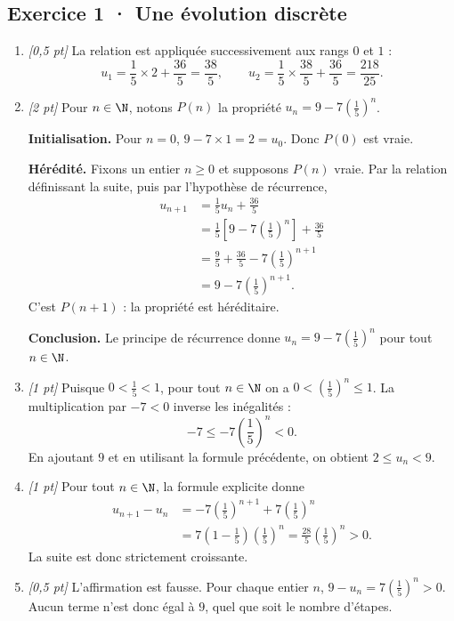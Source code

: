 \subsection*{Exercice 1 · Une évolution discrète}\begin{enumerate}

\item \textit{[0,5 pt]} La relation est appliquée successivement aux rangs $0$ et $1$ :\[u_1=\frac{1}{5}\times 2+\frac{36}{5}=\frac{38}{5},\qquad u_2=\frac{1}{5}\times \frac{38}{5}+\frac{36}{5}=\frac{218}{25}.\]

\item \textit{[2 pt]} Pour $n\in\N$, notons $P(n)$ la propriété $u_n=9-7\left(\frac{1}{5}\right)^n$.
\par\smallskip\textbf{Initialisation.} Pour $n=0$, $9-7\times1=2=u_0$. Donc $P(0)$ est vraie.
\par\smallskip\textbf{Hérédité.} Fixons un entier $n\ge0$ et supposons $P(n)$ vraie. Par la relation définissant la suite, puis par l'hypothèse de récurrence,
\[\begin{aligned}u_{n+1}&=\frac{1}{5}u_n+\frac{36}{5}\\
&=\frac{1}{5}\left[9-7\left(\frac{1}{5}\right)^n\right]+\frac{36}{5}\\
&=\frac{9}{5}+\frac{36}{5}-7\left(\frac{1}{5}\right)^{n+1}\\
&=9-7\left(\frac{1}{5}\right)^{n+1}.
\end{aligned}\]
C'est $P(n+1)$ : la propriété est héréditaire.
\par\smallskip\textbf{Conclusion.} Le principe de récurrence donne $u_n=9-7\left(\frac{1}{5}\right)^n$ pour tout $n\in\N$.

\item \textit{[1 pt]} Puisque $0<\frac{1}{5}<1$, pour tout $n\in\N$ on a $0<(\frac{1}{5})^n\le1$. La multiplication par $-7<0$ inverse les inégalités :
\[-7\le-7(\frac{1}{5})^n<0.\]
En ajoutant $9$ et en utilisant la formule précédente, on obtient $2\le u_n<9$.

\item \textit{[1 pt]} Pour tout $n\in\N$, la formule explicite donne
\[\begin{aligned}u_{n+1}-u_n&=-7(\frac{1}{5})^{n+1}+7(\frac{1}{5})^n\\&=7(1-\frac{1}{5})(\frac{1}{5})^n=\frac{28}{5}(\frac{1}{5})^n>0.\end{aligned}\]
La suite est donc strictement croissante.

\item \textit{[0,5 pt]} L'affirmation est fausse. Pour chaque entier $n$, $9-u_n=7(\frac{1}{5})^n>0$. Aucun terme n'est donc égal à $9$, quel que soit le nombre d'étapes.

\end{enumerate}

